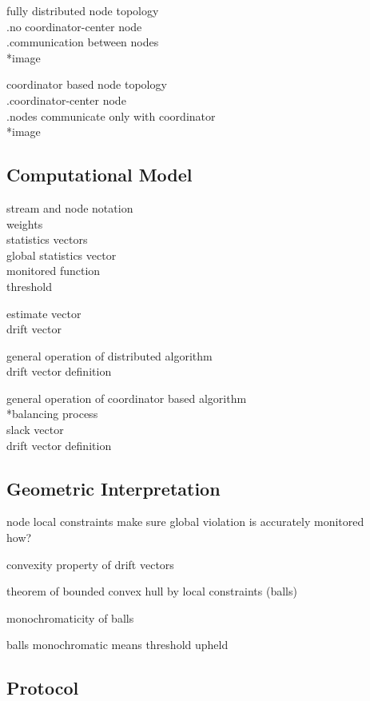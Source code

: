 fully distributed node topology\\
	.no coordinator-center node\\
	.communication between nodes\\
	*image

coordinator based node topology\\
	.coordinator-center node\\
	.nodes communicate only with coordinator\\
	*image

\subsection{Computational Model} \label{subsec:theorBack-GM-compMod}

stream and node notation\\
weights\\
statistics vectors\\
	global statistics vector\\
monitored function\\
threshold

estimate vector\\
drift vector

general operation of distributed algorithm\\
	drift vector definition

general operation of coordinator based algorithm\\
	*balancing process\\
		slack vector\\
	drift vector definition

\subsection{Geometric Interpretation} \label{subsec:theorBack-GM-geomInt}

node local constraints make sure global violation is accurately monitored\\
how?

convexity property of drift vectors

theorem of bounded convex hull by local constraints (balls)

monochromaticity of balls

balls monochromatic means threshold upheld


\subsection{Protocol} \label{subsec:theorBack-GM-protocol}

